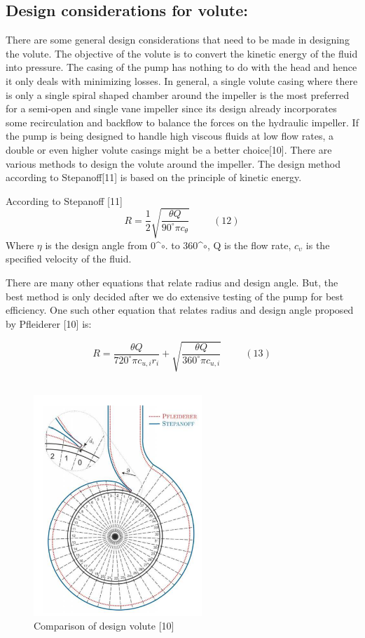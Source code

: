 \documentclass[11pt,a4paper]{scrartcl}
\begin{document}
\subsection{Design considerations for volute:}
There are some general design considerations that need to be made in designing the volute. The objective of the volute is to convert the kinetic energy of the fluid into pressure. The casing of the pump has nothing to do with the head and hence it only deals with minimizing losses. In general, a single volute casing where there is only a single spiral shaped chamber around the impeller is the most preferred for a semi-open and single vane impeller since its design already incorporates some recirculation and backflow to balance the forces on the hydraulic impeller. If the pump is being designed to handle high viscous fluids at low flow rates, a double or even higher volute casings might be a better choice[10].
There are various methods to design the volute around the impeller. The design method according to Stepanoff[11] is based on the principle of kinetic energy.\par 
According to Stepanoff [11]
$$R=\frac{1}{2}\sqrt{\frac{{\theta}Q}{90^\circ{\pi}c_{\theta}}}\hspace{1cm}(12)$$
Where $\eta$ is the design angle from 0^$\circ$. to 360^$\circ$, Q is the flow rate, $c_υ$ is the specified velocity of the fluid. \par

There are many other equations that relate radius and design angle. But, the best method is only decided after we do extensive testing of the pump for best efficiency. One such other equation that relates radius and design angle proposed by Pfleiderer [10] is:

$$R=\frac{{\theta}Q}{720^\circ{\pi}c_{u,i}r_i}+\sqrt{\frac{{\theta}Q}{360^\circ{\pi}c_{u,i}}}\hspace{1cm}(13)$$
\\
\begin{figure}[h]
    \centering
    \includegraphics[scale=0.8]{image5.png}
    \caption{Comparison of design volute [10]}
    \label{fig:image4}
    
\end{figure}
\\
\end{document}
